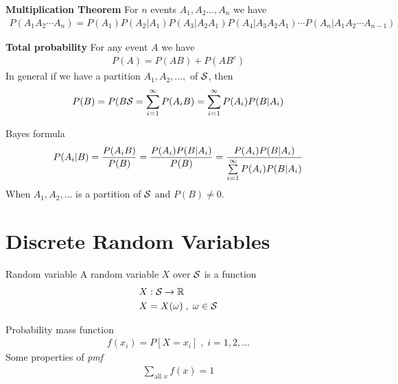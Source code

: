 \documentclass[16pt,a4paper]{article}
\begin{document}
\begin{thm}{\textbf{Multiplication Theorem}}
For $n$ events $A_1, A_2 \ldots, A_n$ we have 
\begin{align*}
P(A_1A_2\cdots A_n) = P(A_1)P(A_2\vert A_1)P(A_3\vert A_2A_1)P(A_4\vert A_3A_2A_1)\cdots P(A_n\vert A_1A_2\cdots A_{n-1})
\end{align*}
\end{thm}

\begin{thm}{\textbf{Total probability}}
For any event $A$ we have 
\begin{align*}
P(A) = P(AB) + P(AB^c)
\end{align*}
In general if we have a partition $A_1, A_2, \ldots,$ of ${\cal S}$, then 
\begin{align*}
P(B) = P(B{\cal S} = \sum\limits_{i=1}^{\infty}P(A_iB) = \sum\limits_{i=1}^{\infty}P(A_i)P(B\vert A_i)
\end{align*}
\end{thm}

\begin{thm}{Bayes formula}
\begin{align*}
P(A_i\vert B) = \frac{P(A_iB)}{P(B)} = \frac{P(A_i)P(B\vert A_i)}{P(B)} = \frac{P(A_i)P(B\vert A_i)}{\sum\limits_{i=1}^{\infty}P(A_i)P(B\vert A_i)}
\end{align*}
When $A_1, A_2, \ldots$ is a partition of ${\cal S}$ and $P(B) \neq 0$. 
\end{thm}
\newpage
\section{Discrete Random Variables}
\begin{defn}{Random variable}
A random variable $X$ over ${\cal S}$ is a function 
\begin{align*}
&X: {\cal S}\to \mathbb{R}\\
&X = X(\omega) \;,\; \omega \in {\cal S}
\end{align*}
\end{defn}
\begin{defn}{Probability mass function}
\begin{align*}
f(x_i) = P[X=x_i] \;,\; i =  1,2,\ldots
\end{align*}
Some properties of \textit{pmf}
\begin{align*}
\sum_{\text{all }x} f(x) = 1
\end{align*}
\end{defn}
\end{document}
